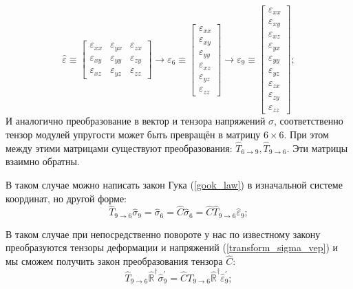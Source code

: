 \documentclass[../main.tex]{subfiles}
\newcommand{\vep}{\varepsilon}
\begin{document}
    \begin{equation}
        \hat \varepsilon 
        \equiv
        \begin{bmatrix} 
            \vep_{xx} & \vep_{yx} & \vep_{zx}\\
            \vep_{xy} & \vep_{yy} & \vep_{zy}\\
            \vep_{xz} & \vep_{yz} & \vep_{zz}
        \end{bmatrix}
        \rightarrow
        \varepsilon_{6}
        \equiv
        \begin{bmatrix}
            \vep_{xx}\\
            \vep_{xy}\\
            \vep_{yy}\\
            \vep_{xz}\\
            \vep_{yz}\\
            \vep_{zz}
        \end{bmatrix}
        \rightarrow
        \varepsilon_{9}
        \equiv
        \begin{bmatrix}
            \vep_{xx}\\
            \vep_{xy}\\
            \vep_{xz}\\
            \vep_{yx}\\
            \vep_{yy}\\
            \vep_{yz}\\
            \vep_{zx}\\
            \vep_{zy}\\
            \vep_{zz}
        \end{bmatrix};
    \end{equation}
    И аналогично преобразование в вектор и тензора напряжений $\sigma$, соответственно тензор модулей упругости может быть превращён в матрицу $6 \times 6$.
    При этом между этими матрицами существуют преобразования: $\hat{T}_{6\rightarrow 9}, \hat{T}_{9\rightarrow 6}$. Эти матрицы взаимно обратны.

    В таком случае можно написать закон Гука (\ref{gook_law}) в изначальной системе координат, 
    но другой форме:
    \begin{equation}
        \hat{T}_{9 \rightarrow 6} \hat{\sigma}_{9} = \hat{\sigma}_{6} = \hat{C} \hat{\sigma}_{6} = \hat{C} \hat{T}_{9 \rightarrow 6} \hat{\vep}_{9};
    \end{equation}

    В таком случае при непосредственно повороте у нас по известному закону преобразуются тензоры деформации и напряжений (\ref{transform_sigma_vep}) и мы сможем
    получить закон преобразования тензора $\hat{C}$:
    \begin{equation*}
        \hat{T}_{9 \rightarrow 6} \hat{\mathbb{R}}^\dagger \hat{\sigma}^{'}_{9} = \hat{C} T_{9 \rightarrow 6} \hat{\mathbb{R}}^\dagger \hat{\vep}^{'}_{9};
    \end{equation*}
\end{document}
